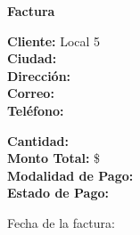 \documentclass{article}
\begin{document}
\begin{center}
    {\LARGE \textbf{Factura}}\\[1cm]
\end{center}

\textbf{Cliente:} Local 5 \\
\textbf{Ciudad:}  \\
\textbf{Dirección:}  \\
\textbf{Correo:}  \\
\textbf{Teléfono:}  \\

\vspace{0.5cm}

\textbf{Cantidad:}  \\
\textbf{Monto Total:} \$  \\
\textbf{Modalidad de Pago:}  \\
\textbf{Estado de Pago:}  \\

\vspace{1cm}

Fecha de la factura: 
\end{document}
